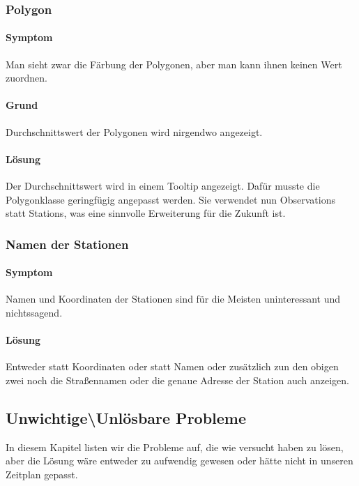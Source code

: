 \subsubsection{Polygon}
\paragraph{Symptom}

Man sieht zwar die Färbung der Polygonen, aber man kann ihnen keinen Wert zuordnen.


\paragraph{Grund}
Durchschnittswert der Polygonen wird nirgendwo angezeigt.

\paragraph{Lösung}
Der Durchschnittswert wird in einem Tooltip angezeigt. Dafür musste die Polygonklasse geringfügig
angepasst werden. Sie verwendet nun Observations statt Stations, was eine sinnvolle Erweiterung für die Zukunft ist.


\subsubsection{Namen der Stationen}
\paragraph{Symptom}

Namen und Koordinaten der Stationen sind für die Meisten uninteressant und nichtssagend.
 

\paragraph{Lösung}
Entweder statt Koordinaten oder statt Namen oder zusätzlich zun den obigen zwei noch die Straßennamen oder die genaue Adresse der Station auch anzeigen.


\subsection{Unwichtige\textbackslash Unlösbare Probleme}

In diesem Kapitel listen wir die Probleme auf, die wie versucht haben zu lösen, aber die Lösung wäre entweder zu aufwendig gewesen oder hätte nicht in unseren Zeitplan gepasst.


